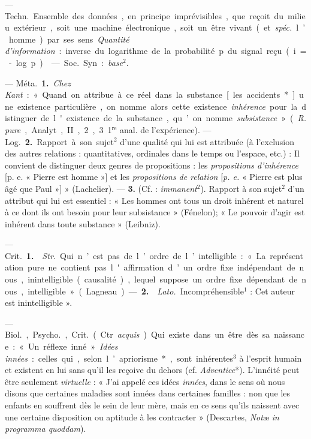 \begin{itemize}[leftmargin=1cm, label=, itemsep=1pt]
 — \si{Techn.} Ensemble des données, en principe
imprévisibles, que reçoit du milieu extérieur, soit une machine électronique,
soit un être vivant (et {\it spéc.} l’homme) par ses sens. {\it Quantité
d’information} : inverse du logarithme de la probabilité p du signal reçu
(i = - log p).

 — \si{Soc.} Syn. : {\it base}$^2$.

 — \si{Méta.} {\bf 1.} {\it Chez Kant} : « Quand on attribue à
ce réel dans la substance [les accidents*] une existence particulière, on
nomme alors cette existence {\it inhérence} pour la distinguer de l'existence
de la substance, qu’on nomme {\it subsistance} » ({\it R. pure}, Analyt., II,
2, 3 1$^\text{re}$ anal. de l'expérience). — \si{Log.}  {\bf 2.} Rapport à
son sujet$^2$ d’une qualité qui lui est attribuée (à l’exclusion des autres
relations : quantitatives, ordinales dans le temps ou l’espace, etc.) : Il
convient de distinguer deux genres de propositions : les {\it propositions
d’inhérence} [p. e. « Pierre est homme »] et les {\it propositions de
relation} [{\it p. e.} « Pierre est plus âgé que Paul »] » (Lachelier). —
{\bf 3.} (Cf. :
{\it immanent}$^2$). Rapport à son sujet$^2$ d'un attribut qui lui est
essentiel : « Les hommes ont tous un droit inhérent et naturel à ce dont ils
ont besoin pour leur subsistance » (Fénelon); « Le pouvoir d'agir est
inhérent dans toute substance » (Leibniz).

 — \si{Crit.} {\bf 1.}  {\it Str.} Qui
n’est pas de l’ordre de l’intelligible : « La représentation pure ne contient
pas l'affirmation d’un ordre fixe indépendant de nous, inintelligible
(causalité), lequel suppose un ordre fixe dépendant de nous,
intelligible » (Lagneau). — {\bf 2.}  {\it Lato.}
Incompréhensible$^1$ : Cet auteur est inintelligible ».

 — \si{Biol.}, \si{Psycho.}, \si{Crit.} (Ctr. {\it acquis}). Qui
existe dans un être dès sa naissance : « Un réflexe inné ». {\it Idées
innées} : celles qui, selon l’apriorisme*, sont inhérentes$^3$ à l'esprit
humain et existent en lui sans qu'il les reçoive du dehors (cf.
{\it Adventice}*). L’innéité peut être seulement {\it virtuelle} : « J'ai
appelé ces idées {\it innées}, dans le sens où nous disons que certaines
maladies sont innées dans certaines familles : non que les enfants en
souffrent dès le sein de leur mère, mais en ce sens qu'ils naissent avec une
certaine disposition ou aptitude à les contracter » (Descartes, {\it Not}æ {\it in
programma quoddam}).


\end{itemize}
